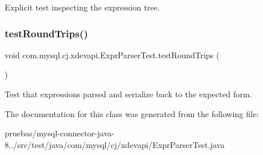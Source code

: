Explicit test inspecting the expression tree. \mbox{\label{classcom_1_1mysql_1_1cj_1_1xdevapi_1_1_expr_parser_test_a472616b8dbef32e1fb26aa421ea037dd}} 
\subsubsection{\texorpdfstring{test\+Round\+Trips()}{testRoundTrips()}}
{\footnotesize\ttfamily void com.\+mysql.\+cj.\+xdevapi.\+Expr\+Parser\+Test.\+test\+Round\+Trips (\begin{DoxyParamCaption}{ }\end{DoxyParamCaption})}

Test that expressions parsed and serialize back to the expected form. 

The documentation for this class was generated from the following file\+:\begin{DoxyCompactItemize}
\item 
pruebas/mysql-\/connector-\/java-\/8../src/test/java/com/mysql/cj/xdevapi/Expr\+Parser\+Test.\+java\end{DoxyCompactItemize}
